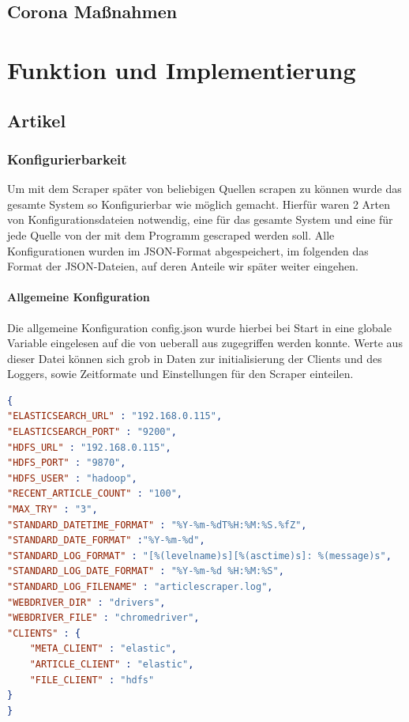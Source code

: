 \documentclass[12pt,oneside,a4paper,parskip]{scrbook}
\begin{document}
\section{Corona Maßnahmen}

\chapter{Funktion und Implementierung}
\section{Artikel}
\subsection{Konfigurierbarkeit}
Um mit dem Scraper später von beliebigen Quellen scrapen zu können wurde das gesamte System so Konfigurierbar wie möglich gemacht. Hierfür waren 2 Arten von Konfigurationsdateien notwendig, eine für das gesamte System und eine für jede Quelle von der mit dem Programm gescraped werden soll. Alle Konfigurationen wurden im JSON-Format abgespeichert, im folgenden das Format der JSON-Dateien, auf deren Anteile wir später weiter eingehen.
\subsubsection{Allgemeine Konfiguration}
Die allgemeine Konfiguration config.json wurde hierbei bei Start in eine globale Variable eingelesen auf die von ueberall aus zugegriffen werden konnte. Werte aus dieser Datei können sich grob in Daten zur initialisierung der Clients und des Loggers, sowie Zeitformate und Einstellungen für den Scraper einteilen. 
\begin{lstlisting}[caption=config.json,label=config,language=json]
{
"ELASTICSEARCH_URL" : "192.168.0.115",
"ELASTICSEARCH_PORT" : "9200",
"HDFS_URL" : "192.168.0.115",
"HDFS_PORT" : "9870",
"HDFS_USER" : "hadoop",
"RECENT_ARTICLE_COUNT" : "100", 
"MAX_TRY" : "3",
"STANDARD_DATETIME_FORMAT" : "%Y-%m-%dT%H:%M:%S.%fZ",
"STANDARD_DATE_FORMAT" :"%Y-%m-%d",
"STANDARD_LOG_FORMAT" : "[%(levelname)s][%(asctime)s]: %(message)s",
"STANDARD_LOG_DATE_FORMAT" : "%Y-%m-%d %H:%M:%S",
"STANDARD_LOG_FILENAME" : "articlescraper.log",
"WEBDRIVER_DIR" : "drivers",
"WEBDRIVER_FILE" : "chromedriver",
"CLIENTS" : {   
    "META_CLIENT" : "elastic",
    "ARTICLE_CLIENT" : "elastic",
    "FILE_CLIENT" : "hdfs"
}
}
\end{lstlisting}
\end{document}
